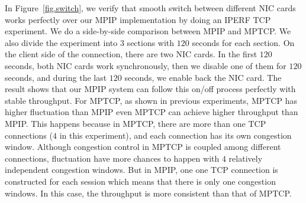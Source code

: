 In Figure~\ref{fig.switch}, we verify that smooth switch between different NIC cards works perfectly over our MPIP implementation by doing an IPERF TCP experiment. We do a side-by-side comparison between MPIP and MPTCP. We also divide the experiment into $3$ sections with $120$ seconds for each section. On the client side of the connection, there are two NIC cards. In the first $120$ seconds, both NIC cards work synchronously, then we disable one of them for $120$ seconds, and during the last $120$ seconds, we enable back the NIC card. The result shows that our MPIP system can follow this on/off process perfectly with stable throughput. For MPTCP, as shown in previous experiments, MPTCP has higher fluctuation than MPIP even MPTCP can achieve higher throughput than MPIP. This happens because in MPTCP, there are more than one TCP connections ($4$ in this experiment), and each connection has its own congestion window. Although congestion control in MPTCP is coupled among different connections, fluctuation have more chances to happen with $4$ relatively independent congestion windows. But in MPIP, one one TCP connection is constructed for each session which means that there is only one congestion windows. In this case, the throughput is more consistent than that of MPTCP.
